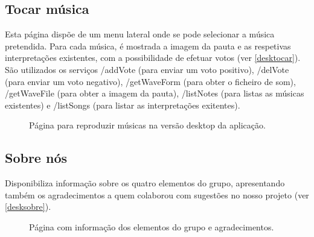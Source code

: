 \subsection{Tocar música}
Esta página dispõe de um menu lateral onde se pode selecionar a música pretendida. Para cada música, é mostrada a imagem da pauta e as respetivas interpretações existentes, com a possibilidade de efetuar votos (ver \autoref{desktocar}). São utilizados os serviços /addVote (para enviar um voto positivo), /delVote (para enviar um voto negativo), /getWaveForm (para obter o ficheiro de som), /getWaveFile (para obter a imagem da pauta), /listNotes (para listas as músicas existentes) e /listSongs (para listar as interpretações exitentes).

\begin{figure}[htp]
\centering
{}
\caption{Página para reproduzir músicas na versão desktop da aplicação.}
\label{desktocar}
\end{figure}

\subsection{Sobre nós}
Disponibiliza informação sobre os quatro elementos do grupo, apresentando também os agradecimentos a quem colaborou com sugestões no nosso projeto (ver \autoref{desksobre}).

\begin{figure}[htp]
\centering
{}
\caption{Página com informação dos elementos do grupo e agradecimentos.}
\label{desksobre}
\end{figure}